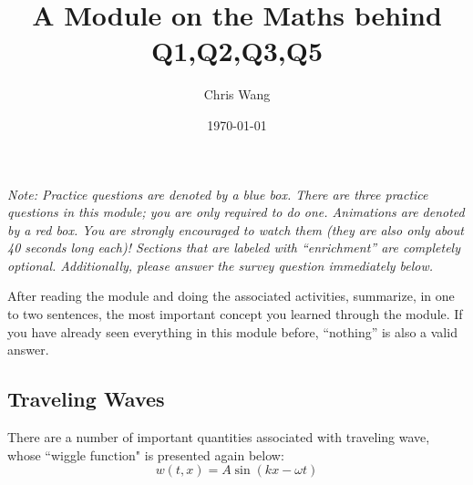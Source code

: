 \documentclass{article}
\title{A Module on the Maths behind Q1,Q2,Q3,Q5}
\author{Chris Wang}
\date{\today}
\begin{document}
\maketitle

\textit{Note: Practice questions are denoted by a blue box. There are three practice questions in this module; you are only required to do one. Animations are denoted by a red box. You are strongly encouraged to watch them (they are also only about 40 seconds long each)! Sections that are labeled with ``enrichment'' are completely optional. Additionally, please answer the survey question immediately below.}

\begin{tcolorbox}[arc=2mm, colback=green!10!white, colframe=green!50!black, title=\textsc{Survey Question}]
	After reading the module and doing the associated activities, summarize, in one to two sentences, the most important concept you learned through the module. If you have already seen everything in this module before, ``nothing'' is also a valid answer.
\end{tcolorbox}

\subsection*{Traveling Waves}

There are a number of important quantities associated with traveling wave, whose ``wiggle function" is presented again below:
\begin{equation}
	w(t,x) = A \sin(kx-\omega t) \tag{linear wave}
\end{equation}
\end{document}
